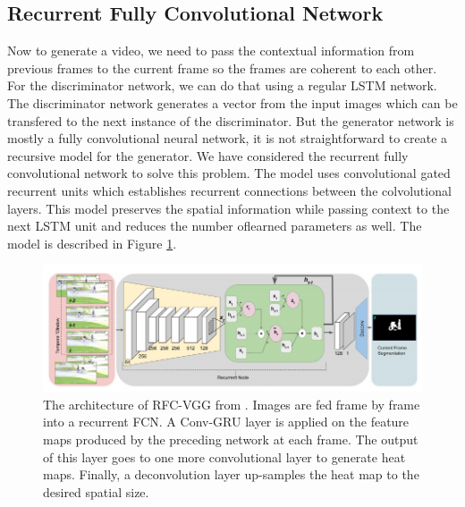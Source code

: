 \documentclass{article}
\begin{document}
\subsection{Recurrent Fully Convolutional Network}
Now to generate a video, we need to pass the contextual information from previous frames to the current frame so the frames are coherent to each other. For the discriminator network, we can do that using a regular LSTM network. The discriminator network generates a vector from the input images which can be transfered to the next instance of the discriminator. But the generator network is mostly a fully convolutional neural network, it is not straightforward to create a recursive model for the generator. We have considered the recurrent fully convolutional network \cite{rFCN} to solve this problem. The model uses convolutional gated recurrent units which establishes recurrent connections between the colvolutional layers. This model preserves the spatial information while passing context to the next LSTM unit and reduces the number oflearned parameters as well. The model is described in Figure \ref{recurrent_fcn}.

\begin{figure}[h]
  \centering
  \includegraphics[scale=0.4]{recurrent_fcn.png} 
  \caption{The architecture of RFC-VGG from \cite{rFCN}. Images are fed frame by frame into a recurrent FCN. A Conv-GRU layer is applied on the feature maps produced by the preceding network at each frame.
The output of this layer goes to one more convolutional layer to generate heat maps. Finally, a
deconvolution layer up-samples the heat map to the desired spatial size.}
  \label{recurrent_fcn}
\end{figure}
\end{document}
